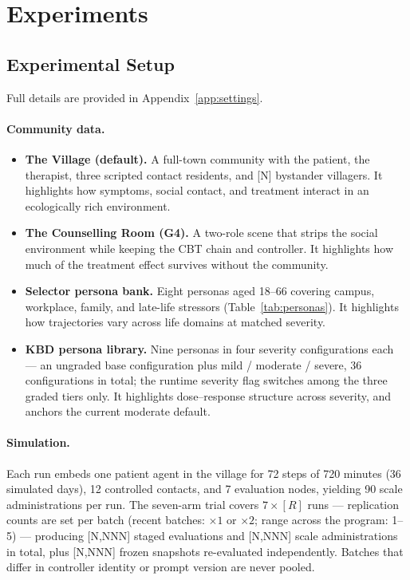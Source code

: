 \documentclass[10pt]{article}
\begin{document}
\section{Experiments}\label{sec:exp}

\subsection{Experimental Setup}\label{sec:setup}

Full details are provided in Appendix~\ref{app:settings}.

\paragraph{Community data.}
\begin{itemize}
\item \textbf{The Village (default).} A full-town community with the patient, the therapist, three scripted contact residents, and [N] bystander villagers. It highlights how symptoms, social contact, and treatment interact in an ecologically rich environment.
\item \textbf{The Counselling Room (G4).} A two-role scene that strips the social environment while keeping the CBT chain and controller. It highlights how much of the treatment effect survives without the community.
\item \textbf{Selector persona bank.} Eight personas aged 18--66 covering campus, workplace, family, and late-life stressors (Table~\ref{tab:personas}). It highlights how trajectories vary across life domains at matched severity.
\item \textbf{KBD persona library.} Nine personas in four severity configurations each --- an ungraded base configuration plus mild / moderate / severe, 36 configurations in total; the runtime severity flag switches among the three graded tiers only. It highlights dose--response structure across severity, and anchors the current moderate default.
\end{itemize}

\paragraph{Simulation.}
Each run embeds one patient agent in the village for 72 steps of 720 minutes (36 simulated days), 12 controlled contacts, and 7 evaluation nodes, yielding 90 scale administrations per run.
The seven-arm trial covers $7 \times [R]$ runs --- replication counts are set per batch (recent batches: $\times 1$ or $\times 2$; range across the program: 1--5) --- producing [N,NNN] staged evaluations and [N,NNN] scale administrations in total, plus [N,NNN] frozen snapshots re-evaluated independently.
Batches that differ in controller identity or prompt version are never pooled.
\end{document}
